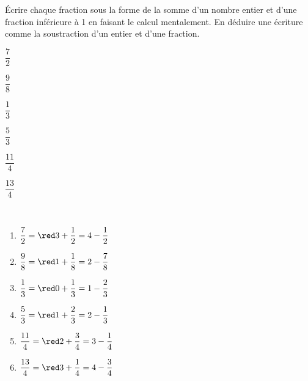 
\begin{exercice*}
   Écrire chaque fraction sous la forme de la somme d'un nombre entier et d'une fraction inférieure à 1 en faisant le calcul mentalement. En déduire une écriture comme la soustraction d'un entier et d'une fraction.   
      \begin{multicols}{3}
         \begin{enumerate}
            \begin{spacing}{2}
               \item $\dfrac72$
               \item $\dfrac98$
               \item $\dfrac13$
               \item $\dfrac53$
               \item $\dfrac{11}{4}$
               \item $\dfrac{13}{4}$
            \end{spacing}
         \end{enumerate}
      \end{multicols}   
\end{exercice*}

\begin{corrige}
   \ \\ [-5mm]
   \begin{enumerate}
      \item $\dfrac72 =\red 3+\dfrac12 =4-\dfrac12$ \medskip
      \item $\dfrac98 =\red 1+\dfrac18 =2-\dfrac78$ \medskip
      \item $\dfrac13 =\red 0+\dfrac13 =1-\dfrac23$ \medskip
      \item $\dfrac53 =\red 1+\dfrac23 =2-\dfrac13$ \medskip
      \item $\dfrac{11}{4} =\red 2+\dfrac34 =3-\dfrac14$ \medskip
      \item $\dfrac{13}{4} =\red 3+\dfrac14 =4-\dfrac34$
   \end{enumerate}
\end{corrige}